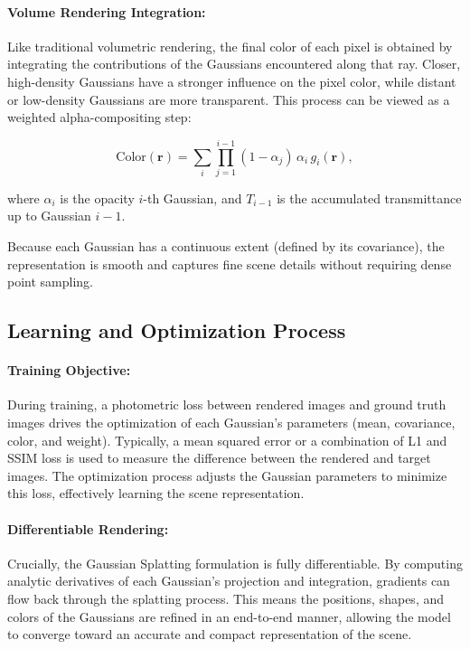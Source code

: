 \paragraph{Volume Rendering Integration:}
Like traditional volumetric rendering, the final color of each pixel is obtained by integrating the contributions of the Gaussians encountered along that ray.
Closer, high-density Gaussians have a stronger influence on the pixel color, while distant or low-density Gaussians are more transparent.
This process can be viewed as a weighted alpha-compositing step:


\begin{equation}
    \text{Color}(\mathbf{r}) = \sum_{i} \prod_{j=1}^{i-1}(1 - \alpha_j) \,\alpha_i \,g_i(\mathbf{r}),
\end{equation}

where $\alpha_i$ is the opacity $i$-th Gaussian, and $T_{i-1}$ is the accumulated transmittance up to Gaussian $i-1$.

Because each Gaussian has a continuous extent (defined by its covariance), the representation is smooth and captures fine scene details without requiring dense point sampling.

\subsection{Learning and Optimization Process}
\paragraph{Training Objective:}
During training, a photometric loss between rendered images and ground truth images drives the optimization of each Gaussian's parameters (mean, covariance, color, and weight).
Typically, a mean squared error or a combination of L1 and SSIM loss is used to measure the difference between the rendered and target images.
The optimization process adjusts the Gaussian parameters to minimize this loss, effectively learning the scene representation.

\paragraph{Differentiable Rendering:}
Crucially, the Gaussian Splatting formulation is fully differentiable.
By computing analytic derivatives of each Gaussian's projection and integration, gradients can flow back through the splatting process.
This means the positions, shapes, and colors of the Gaussians are refined in an end-to-end manner, allowing the model to converge toward an accurate and compact representation of the scene.


